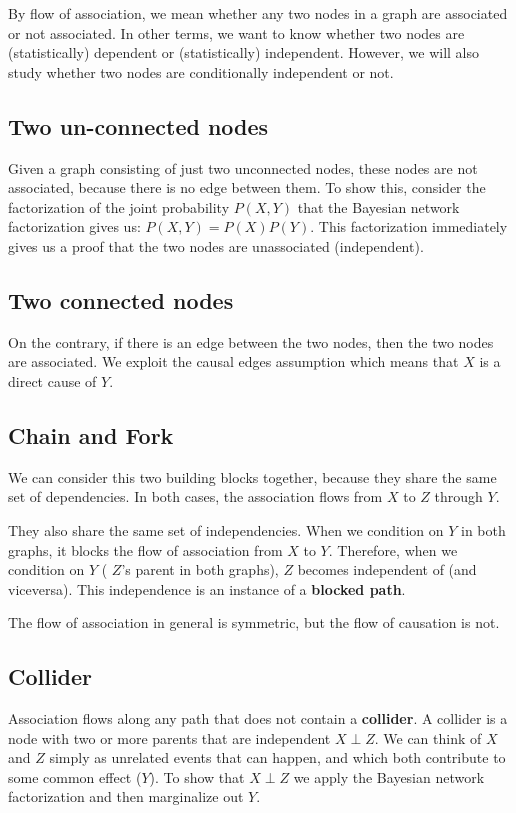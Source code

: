 By flow of association, we mean whether any two nodes in a graph are associated
or not associated. In other terms, we want to know whether two nodes are
(statistically) dependent or (statistically) independent. However, we will also
study whether two nodes are conditionally independent or not.
\subsection{Two un-connected nodes}
Given a graph consisting of just two unconnected nodes, these nodes are not
associated, because there is no edge between them. To show this, consider the
factorization of the joint probability $P(X, Y)$ that the Bayesian network
factorization gives us: $P(X, Y) = P(X)P(Y)$. This factorization immediately
gives us a proof that the two nodes are unassociated (independent).
\subsection{Two connected nodes}
On the contrary, if there is an edge between the two nodes, then the two nodes
are associated. We exploit the causal edges assumption which means that $X$ is
a direct cause of $Y$.
\subsection{Chain and Fork}
We can consider this two building blocks together, because they share the same
set of dependencies. In both cases, the association flows from $X$ to $Z$ through
$Y$.

They also share the same set of independencies. When we condition on $Y$ in both
graphs, it blocks the flow of association from $X$ to $Y$. Therefore, when we
condition on $Y$ ( $Z$'s parent in both graphs), $Z$ becomes independent of (and
viceversa). This independence is an instance of a \textbf{blocked path}.
\begin{note}
    The flow of association in general is symmetric, but the flow of causation
    is not.
\end{note}
\subsection{Collider}
Association flows along any path that does not contain a \textbf{collider}. A
collider is a node with two or more parents that are independent $X \perp Z$.
We can think of $X$ and $Z$ simply as unrelated events that can happen, and which
both contribute to some common effect ($Y$). To show that $X \perp Z$ we apply
the Bayesian network factorization and then marginalize out $Y$.

